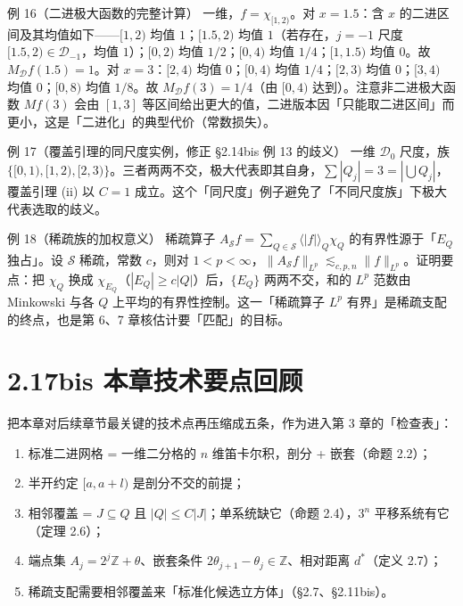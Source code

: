 \documentclass[a4paper,11pt,openany]{ctexbook}
\numberwithin{equation}{chapter}
\numberwithin{figure}{chapter}
\numberwithin{table}{chapter}
\begin{document}
\begin{examplebox}{例 16（二进极大函数的完整计算）}
一维，$f=\chi_{[1,2)}$。对 $x=1.5$：含 $x$ 的二进区间及其均值如下——$[1,2)$ 均值 $1$；$[1.5,2)$ 均值 $1$（若存在，$j=-1$ 尺度 $[1.5,2)\in\mathcal D_{-1}$，均值 $1$）；$[0,2)$ 均值 $1/2$；$[0,4)$ 均值 $1/4$；$[1,1.5)$ 均值 $0$。故 $M_{\mathcal D}f(1.5)=1$。对 $x=3$：$[2,4)$ 均值 $0$；$[0,4)$ 均值 $1/4$；$[2,3)$ 均值 $0$；$[3,4)$ 均值 $0$；$[0,8)$ 均值 $1/8$。故 $M_{\mathcal D}f(3)=1/4$（由 $[0,4)$ 达到）。注意非二进极大函数 $Mf(3)$ 会由 $[1,3]$ 等区间给出更大的值，二进版本因「只能取二进区间」而更小，这是「二进化」的典型代价（常数损失）。
\end{examplebox}

\begin{examplebox}{例 17（覆盖引理的同尺度实例，修正 §2.14bis 例 13 的歧义）}
一维 $\mathcal D_0$ 尺度，族 $\{[0,1),[1,2),[2,3)\}$。三者两两不交，极大代表即其自身，$\sum|Q_j|=3=|\bigcup Q_j|$，覆盖引理 (ii) 以 $C=1$ 成立。这个「同尺度」例子避免了「不同尺度族」下极大代表选取的歧义。
\end{examplebox}

\begin{examplebox}{例 18（稀疏族的加权意义）}
稀疏算子 $A_{\mathcal S}f=\sum_{Q\in\mathcal S}\langle|f|\rangle_Q\chi_Q$ 的有界性源于「$E_Q$ 独占」。设 $\mathcal S$ 稀疏，常数 $c$，则对 $1<p<\infty$，$\|A_{\mathcal S}f\|_{L^p}\lesssim_{c,p,n}\|f\|_{L^p}$。证明要点：把 $\chi_Q$ 换成 $\chi_{E_Q}$（$|E_Q|\ge c|Q|$）后，$\{E_Q\}$ 两两不交，和的 $L^p$ 范数由 Minkowski 与各 $Q$ 上平均的有界性控制。这一「稀疏算子 $L^p$ 有界」是稀疏支配的终点，也是第 6、7 章核估计要「匹配」的目标。
\end{examplebox}

\section{2.17bis 本章技术要点回顾}

把本章对后续章节最关键的技术点再压缩成五条，作为进入第 3 章的「检查表」：

\begin{enumerate}
\item 标准二进网格 = 一维二分格的 $n$ 维笛卡尔积，剖分 + 嵌套（命题 2.2）；
\item 半开约定 $[a,a+l)$ 是剖分不交的前提；
\item 相邻覆盖 = $J\subseteq Q$ 且 $|Q|\le C|J|$；单系统缺它（命题 2.4），$3^n$ 平移系统有它（定理 2.6）；
\item 端点集 $A_j=2^j\mathbb Z+\theta$、嵌套条件 $2\theta_{j+1}-\theta_j\in\mathbb Z$、相对距离 $d^*$（定义 2.7）；
\item 稀疏支配需要相邻覆盖来「标准化候选立方体」（§2.7、§2.11bis）。
\end{enumerate}
\end{document}
